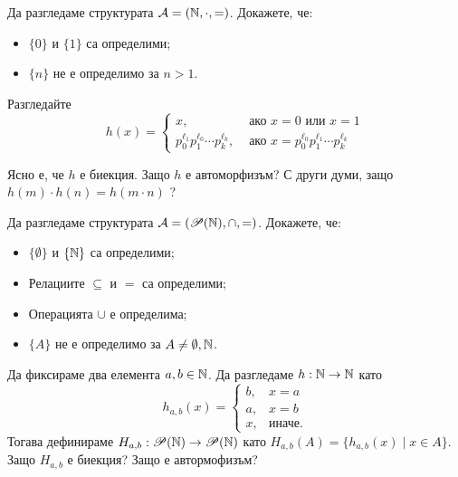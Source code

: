 \begin{problem}
  Да разгледаме структурата $\mathcal{A} = (\mathbb{N}, \cdot ,=)$.
  Докажете, че:
  \begin{itemize}
  \item
    $\{0\}$ и $\{1\}$ са определими;
  \item
    $\{n\}$ не е определимо за $n > 1$.
  \end{itemize}
\end{problem}
\begin{hint}
  Разгледайте
  \[h(x) =
    \begin{cases}
      x, & \text{ ако }x = 0 \text{ или } x = 1\\
      p^{\ell_1}_0p^{\ell_0}_1\cdots p^{\ell_k}_k, & \text{ ако }x = p^{\ell_0}_0 p^{\ell_1}_1 \cdots p^{\ell_k}_k
    \end{cases}\]

  Ясно е, че $h$ е биекция. Защо $h$ е автоморфизъм?
  С други думи, защо $h(m) \cdot h(n) = h(m \cdot n)$ ?
\end{hint}

\begin{problem}
  Да разгледаме структурата $\mathcal{A} = (\mathscr{P}(\mathbb{N}), \cap, =)$.  Докажете, че:
  \begin{itemize}
  \item
    $\{\emptyset\}$ и $\{\mathbb{N}\}$ са определими;
  \item
    Релациите $\subseteq$ и $=$ са определими;
  \item
    Операцията $\cup$ е определима;
  \item
    $\{A\}$ не е определимо за $A \neq \emptyset, \mathbb{N}$.
  \end{itemize}
\end{problem}
\begin{hint}
  Да фиксираме два елемента $a,b\in\mathbb{N}$.
  Да разгледаме $h:\mathbb{N} \to \mathbb{N}$ като
  \[h_{a,b}(x) =
    \begin{cases}
      b, & x = a\\
      a, & x = b\\
      x, & \text{иначе}.
    \end{cases}\]
  Тогава дефинираме $H_{a,b}:\mathscr{P}(\mathbb{N}) \to \mathscr{P}(\mathbb{N})$ като
  $H_{a,b}(A) = \{h_{a,b}(x) \mid x \in A\}$.
  Защо $H_{a,b}$ е биекция? Защо е автормофизъм?
\end{hint}

